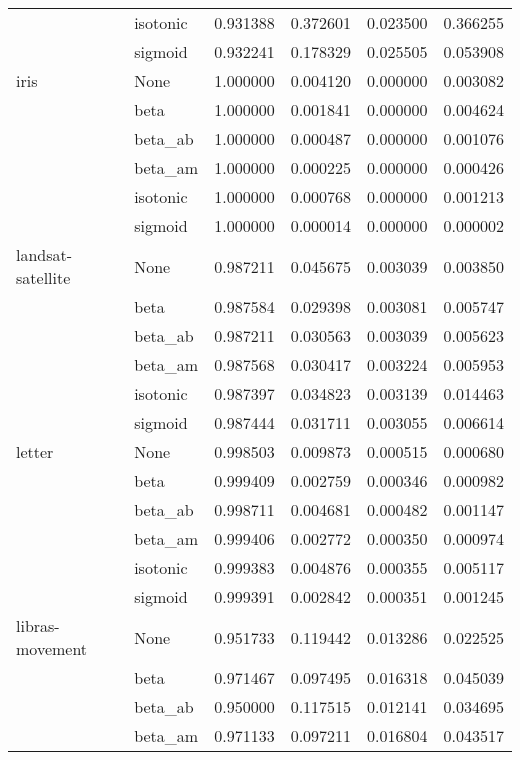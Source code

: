 \begin{tabular}{llrrrr}
        & isotonic &  0.931388 &  0.372601 &  0.023500 &  0.366255 \\
        & sigmoid &  0.932241 &  0.178329 &  0.025505 &  0.053908 \\
iris & None &  1.000000 &  0.004120 &  0.000000 &  0.003082 \\
        & beta &  1.000000 &  0.001841 &  0.000000 &  0.004624 \\
        & beta\_ab &  1.000000 &  0.000487 &  0.000000 &  0.001076 \\
        & beta\_am &  1.000000 &  0.000225 &  0.000000 &  0.000426 \\
        & isotonic &  1.000000 &  0.000768 &  0.000000 &  0.001213 \\
        & sigmoid &  1.000000 &  0.000014 &  0.000000 &  0.000002 \\
landsat-satellite & None &  0.987211 &  0.045675 &  0.003039 &  0.003850 \\
        & beta &  0.987584 &  0.029398 &  0.003081 &  0.005747 \\
        & beta\_ab &  0.987211 &  0.030563 &  0.003039 &  0.005623 \\
        & beta\_am &  0.987568 &  0.030417 &  0.003224 &  0.005953 \\
        & isotonic &  0.987397 &  0.034823 &  0.003139 &  0.014463 \\
        & sigmoid &  0.987444 &  0.031711 &  0.003055 &  0.006614 \\
letter & None &  0.998503 &  0.009873 &  0.000515 &  0.000680 \\
        & beta &  0.999409 &  0.002759 &  0.000346 &  0.000982 \\
        & beta\_ab &  0.998711 &  0.004681 &  0.000482 &  0.001147 \\
        & beta\_am &  0.999406 &  0.002772 &  0.000350 &  0.000974 \\
        & isotonic &  0.999383 &  0.004876 &  0.000355 &  0.005117 \\
        & sigmoid &  0.999391 &  0.002842 &  0.000351 &  0.001245 \\
libras-movement & None &  0.951733 &  0.119442 &  0.013286 &  0.022525 \\
        & beta &  0.971467 &  0.097495 &  0.016318 &  0.045039 \\
        & beta\_ab &  0.950000 &  0.117515 &  0.012141 &  0.034695 \\
        & beta\_am &  0.971133 &  0.097211 &  0.016804 &  0.043517 \\

\end{tabular}
